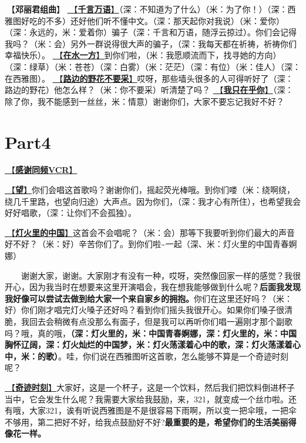\documentclass[]{ctexbook}
\begin{document}
🎵【\textbf{邓丽君组曲}】
\hyperref[thousands-of-words]{🎵【\textbf{千言万语}】}（深：不知道为了什么）（米：为了你！）（深：西雅图好吃的不多）还好他们听不懂中文。（深：那天起你对我说）（米：爱你）（深：永远的，米：爱着你）骗子（深：千言和万语，随浮云掠过）。你们会记得我吗？（米：会）另外一群说得很大声的骗子，（深：我每天都在祈祷，祈祷你们幸福快乐）。
\hyperref[on-the-water-side]{🎵【\textbf{在水一方}】}到你们啦，（米：我愿顺流而下，找寻她的方向）（深：绿草）（米：苍苍）（深：白雾）（米：茫茫）（深：有位）（米：佳人）（深：在西雅图）。
\hyperref[only-with-me]{🎵【\textbf{路边的野花不要采}】}哎呀，那些墙头很多的人可得听好了（深：路边的野花）他怎么样？（米：你不要采）听清楚了吗？
\hyperref[only-you]{🎵【\textbf{我只在乎你}】}（深：除了你，我不能感到一丝丝，米：情意）谢谢你们，大家不要忘记我好不好？

\section{Part4}\label{Seattle-20250305-part4}

\hyperref[thank-you-vcr]{🎥【\textbf{感谢同频VCR}】}

\hyperref[Gaze]{🎵【\textbf{望}】}你们会唱这首歌吗？谢谢你们，摇起荧光棒哦。到你们喽（米：绕啊绕，绕几千里路，也望向归途）大声点。因为你们，（深：我才心有所住），也希望我会好好唱歌，（深：让你们不会孤独）。

\hyperref[China-in-the-lights]{🎵【\textbf{灯火里的中国}】}这首会不会唱呢？（米：会）那等下我要听到你们最大的声音好不好？（米：好）辛苦你们了。到你们啦\textasciitilde 一起（深、米：灯火里的中国青春婀娜）

  谢谢大家，谢谢。大家刚才有没有一种，哎呀，突然像回家一样的感觉？我很开心，因为我当时在想要来这里开演唱会，我在想我能够做到什么呢？\textbf{后面我发现我好像可以尝试去做到给大家一个来自家乡的拥抱。}你们在这里还好吗？（米：好）你们刚才唱完灯火嗓子还好吗？看到你们摇头我很开心。如果你们嗓子很清脆，我回去会稍微有点没那么有面子，但是我可以再听你们唱一遍刚才那个副歌吗？哦，真的哦，\textbf{（深：灯火里的，米：中国青春婀娜，深：灯火里的，米：中国胸怀辽阔，深：灯火灿烂的中国梦，米：灯火荡漾着心中的歌，深：灯火荡漾着心中，米：的歌）}。哇，你们说在西雅图听这首歌，怎么能够不算是一个奇迹时刻呢？

\hyperref[magic-moment]{🎵【\textbf{奇迹时刻}】}大家好，这是一个杯子，这是一个饮料，然后我们把饮料倒进杯子当中，它会发生什么呢？我需要大家给我鼓励，来，321，就变成一个丝巾啦。还有哦，大家321，诶有听说西雅图是不是很容易下雨啊，所以变一把伞哦，一把伞不够用，第二把好不好，给我点鼓励好不好?\textbf{最重要的是，希望你们的生活美丽得像花一样。}
\end{document}
